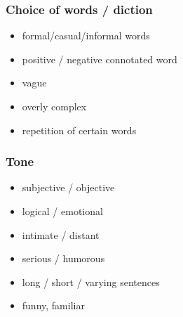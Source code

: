 \documentclass{article}
\begin{document}
	\subsubsection{Choice of words / diction}
	\begin{itemize}
		\item formal/casual/informal words
		\item positive / negative connotated word
		\item vague
		\item overly complex
		\item repetition of certain words
	\end{itemize}

	\subsubsection{Tone}
	\begin{itemize}
		\item subjective / objective
		\item logical / emotional
		\item intimate / distant
		\item serious / humorous
		\item long / short / varying sentences
		\item funny, familiar
	\end{itemize}
\end{document}
